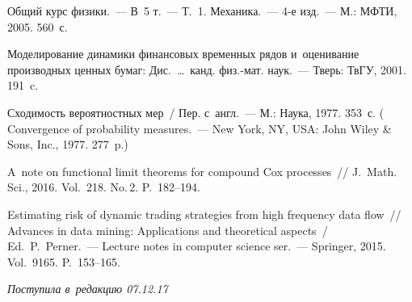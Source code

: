\begin{multicols}{2}
{{\begin{thebibliography}{9}
 Общий курс физики.~--- 
В~5 т.~--- Т.~1. Механика.~--- 4-е изд.~--- М.: МФТИ, 2005. 560~с.

 Моделирование динамики финансовых временных рядов и~оценивание 
производных ценных бумаг: Дис.\ \ldots\ канд. физ.-мат. наук.~--- 
Тверь: ТвГУ, 2001. 191~c.

 Сходимость вероятностных мер~/
Пер. с~англ.~--- М.: Наука, 1977. 353~с.
(  
{Convergence of probability measures}.~--- New York, NY, USA: John Wiley \& Sons, Inc., 
1977. 277~p.)

A~note on functional limit theorems for compound Cox processes~// 
J.~Math. Sci., 2016. Vol.~218. No.\,2. P.~182--194.

Estimating risk of dynamic trading strategies from high frequency data flow~// 
Advances in data mining: Applications and theoretical aspects~/
 Ed.\ P.~Perner.~---
Lecture notes in computer science ser.~--- Springer, 2015.  
 Vol.~9165. P.~153--165.
 \end{thebibliography}

 }
 }

\end{multicols}

\vspace*{-3pt}

\hfill{\small\textit{Поступила в~редакцию 07.12.17}}


\newpage

\vspace*{-28pt}






\def\tit{A~PROBABILITY MODEL OF~THE~INFLUENCE\\ OF~THE~ORDER BOOK ON~THE~PRICE PROCESS}

\def\titkol{A probability model of the influence of the order book on the price process}

\def\aut{L.\,V.~Nazarov, V.\,V.~Lavrentyev, and~E.\,V.~Bykovets}

